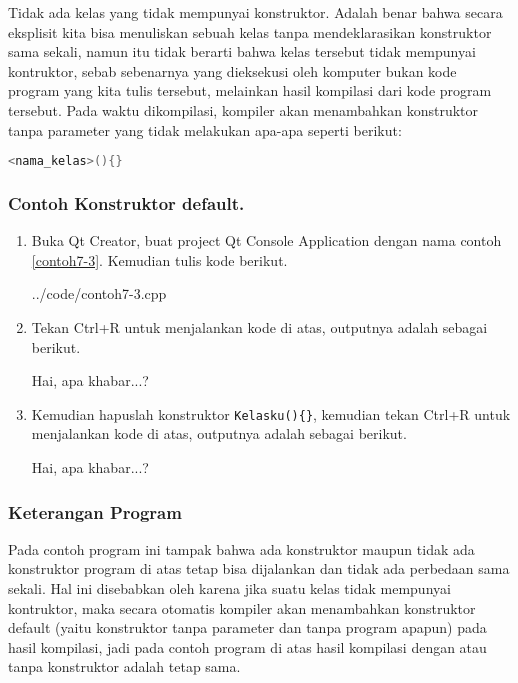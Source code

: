 Tidak ada kelas yang tidak mempunyai konstruktor. Adalah benar bahwa
secara eksplisit kita bisa menuliskan sebuah kelas tanpa mendeklarasikan
konstruktor sama sekali, namun itu tidak berarti bahwa kelas tersebut
tidak mempunyai kontruktor, sebab sebenarnya yang dieksekusi oleh
komputer bukan kode program yang kita tulis tersebut, melainkan hasil
kompilasi dari kode program tersebut. Pada waktu dikompilasi, kompiler
akan menambahkan konstruktor tanpa parameter yang tidak melakukan
apa-apa seperti berikut:

\begin{lstlisting}[language=c++, numbers=none]
<nama_kelas>(){}
\end{lstlisting}

\subsubsection*{Contoh  Konstruktor default.}

\begin{enumerate}

\item
  Buka Qt Creator, buat project Qt Console Application dengan nama
  contoh \ref{contoh7-3}. Kemudian tulis kode berikut.


{../code/contoh7-3.cpp}

\item
  Tekan Ctrl+R untuk menjalankan kode di atas, outputnya adalah sebagai
  berikut.

\begin{lcverbatim}
Hai, apa khabar...?
\end{lcverbatim}



\item
  Kemudian hapuslah konstruktor \texttt{Kelasku()\{\}}, kemudian tekan
  Ctrl+R untuk menjalankan kode di atas, outputnya adalah sebagai
  berikut.
  \begin{lcverbatim}
Hai, apa khabar...?
  \end{lcverbatim}
\end{enumerate}



\subsubsection*{Keterangan Program}

Pada contoh program ini tampak bahwa ada konstruktor maupun tidak ada
konstruktor program di atas tetap bisa dijalankan dan tidak ada
perbedaan sama sekali. Hal ini disebabkan oleh karena jika suatu kelas
tidak mempunyai kontruktor, maka secara otomatis kompiler akan
menambahkan konstruktor default (yaitu konstruktor tanpa parameter dan
tanpa program apapun) pada hasil kompilasi, jadi pada contoh program di
atas hasil kompilasi dengan atau tanpa konstruktor adalah tetap sama.

